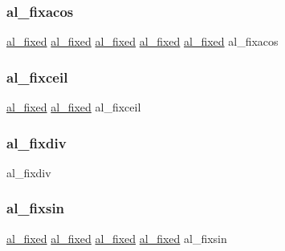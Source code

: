 \subsubsection{\texorpdfstring{al\+\_\+fixacos}{al\_fixacos}}
{\footnotesize\ttfamily \hyperlink{fixed_8h_acaad2e927f969d9882d1e1e80ac1c5e2}{al\+\_\+fixed} \hyperlink{fixed_8h_acaad2e927f969d9882d1e1e80ac1c5e2}{al\+\_\+fixed} \hyperlink{fixed_8h_acaad2e927f969d9882d1e1e80ac1c5e2}{al\+\_\+fixed} \hyperlink{fixed_8h_acaad2e927f969d9882d1e1e80ac1c5e2}{al\+\_\+fixed} \hyperlink{fixed_8h_acaad2e927f969d9882d1e1e80ac1c5e2}{al\+\_\+fixed} al\+\_\+fixacos}

\mbox{\label{fmaths_8inl_a31b6976c5be1580f86dd6c83647e77cd}} 
\subsubsection{\texorpdfstring{al\+\_\+fixceil}{al\_fixceil}}
{\footnotesize\ttfamily \hyperlink{fixed_8h_acaad2e927f969d9882d1e1e80ac1c5e2}{al\+\_\+fixed} \hyperlink{fixed_8h_acaad2e927f969d9882d1e1e80ac1c5e2}{al\+\_\+fixed} al\+\_\+fixceil}

\mbox{\label{fmaths_8inl_af483635343185572cba1f3f6b3ae6610}} 
\subsubsection{\texorpdfstring{al\+\_\+fixdiv}{al\_fixdiv}}
{\footnotesize\ttfamily al\+\_\+fixdiv}

\mbox{\label{fmaths_8inl_a03d9154dc756850ed2d0f47a3628dfd8}} 
\subsubsection{\texorpdfstring{al\+\_\+fixsin}{al\_fixsin}}
{\footnotesize\ttfamily \hyperlink{fixed_8h_acaad2e927f969d9882d1e1e80ac1c5e2}{al\+\_\+fixed} \hyperlink{fixed_8h_acaad2e927f969d9882d1e1e80ac1c5e2}{al\+\_\+fixed} \hyperlink{fixed_8h_acaad2e927f969d9882d1e1e80ac1c5e2}{al\+\_\+fixed} \hyperlink{fixed_8h_acaad2e927f969d9882d1e1e80ac1c5e2}{al\+\_\+fixed} al\+\_\+fixsin}

